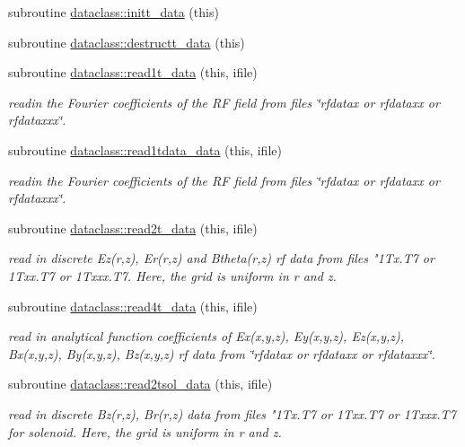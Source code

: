 \begin{DoxyCompactItemize}
subroutine \mbox{\hyperlink{namespacedataclass_a97d261734f3a864b94d895a3d2ac2317}{dataclass\+::initt\+\_\+data}} (this)
\item 
subroutine \mbox{\hyperlink{namespacedataclass_aa6d6d0d2beefc01e5873047a3c78f073}{dataclass\+::destructt\+\_\+data}} (this)
\item 
subroutine \mbox{\hyperlink{namespacedataclass_a8a4f016b0eeea3567fb59c4100c5cdc5}{dataclass\+::read1t\+\_\+data}} (this, ifile)
\begin{DoxyCompactList}\small\item\em readin the Fourier coefficients of the RF field from files \char`\"{}rfdatax or rfdataxx or rfdataxxx\char`\"{}. \end{DoxyCompactList}\item 
subroutine \mbox{\hyperlink{namespacedataclass_a5167a50ad979e317b65f07bf468212d8}{dataclass\+::read1tdata\+\_\+data}} (this, ifile)
\begin{DoxyCompactList}\small\item\em readin the Fourier coefficients of the RF field from files \char`\"{}rfdatax or rfdataxx or rfdataxxx\char`\"{}. \end{DoxyCompactList}\item 
subroutine \mbox{\hyperlink{namespacedataclass_a6a03d5b21b9316f6fd4053aeb7acb426}{dataclass\+::read2t\+\_\+data}} (this, ifile)
\begin{DoxyCompactList}\small\item\em read in discrete Ez(r,z), Er(r,z) and Btheta(r,z) rf data from files "1\+Tx.\+T7 or 1\+Txx.\+T7 or 1\+Txxx.\+T7. Here, the grid is uniform in r and z. \end{DoxyCompactList}\item 
subroutine \mbox{\hyperlink{namespacedataclass_a8159006c3a211e35e4c3e22d94b2abc6}{dataclass\+::read4t\+\_\+data}} (this, ifile)
\begin{DoxyCompactList}\small\item\em read in analytical function coefficients of Ex(x,y,z), Ey(x,y,z), Ez(x,y,z), Bx(x,y,z), By(x,y,z), Bz(x,y,z) rf data from \char`\"{}rfdatax or rfdataxx or rfdataxxx\char`\"{}. \end{DoxyCompactList}\item 
subroutine \mbox{\hyperlink{namespacedataclass_af6df6f58c6c53c92a78e3d512d6a4d03}{dataclass\+::read2tsol\+\_\+data}} (this, ifile)
\begin{DoxyCompactList}\small\item\em read in discrete Bz(r,z), Br(r,z) data from files "1\+Tx.\+T7 or 1\+Txx.\+T7 or 1\+Txxx.\+T7 for solenoid. Here, the grid is uniform in r and z. \end{DoxyCompactList}\item 

\end{DoxyCompactItemize}
